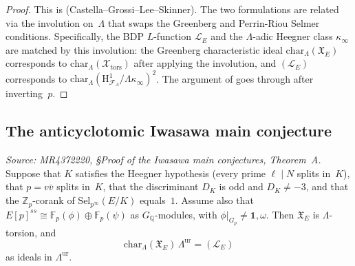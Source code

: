 \begin{proof}
  This is \cite[Thm.~5.2]{BCK} (Castella--Grossi--Lee--Skinner). The two formulations
  are related via the involution on~$\Lambda$ that swaps the Greenberg and
  Perrin-Riou Selmer conditions. Specifically, the BDP $L$-function $\mathcal{L}_E$
  and the $\Lambda$-adic Heegner class $\kappa_\infty$ are matched by this
  involution: the Greenberg characteristic ideal $\mathrm{char}_\Lambda(\mathfrak{X}_E)$
  corresponds to $\mathrm{char}_\Lambda(\mathcal{X}_{\mathrm{tors}})$ after applying
  the involution, and $(\mathcal{L}_E)$ corresponds to
  $\mathrm{char}_\Lambda(\mathrm{H}^1_{\mathcal{F}_\Lambda}/\Lambda\kappa_\infty)^2$.
  The argument of \cite{BCK} goes through after inverting~$p$.
\end{proof}

\subsection{The anticyclotomic Iwasawa main conjecture}

\begin{theorem}
  \label{thm:thmA}
  \textit{Source: MR4372220, \S{}Proof of the Iwasawa main conjectures, Theorem~A.}
  Suppose that $K$ satisfies the Heegner hypothesis (every prime $\ell \mid N$ splits
  in~$K$), that $p = v\bar{v}$ splits in~$K$, that the discriminant $D_K$ is odd and
  $D_K \neq -3$, and that the $\mathbb{Z}_p$-corank of $\mathrm{Sel}_{p^\infty}(E/K)$
  equals~$1$. Assume also that $E[p]^{ss} \cong \mathbb{F}_p(\phi) \oplus \mathbb{F}_p(\psi)$
  as $G_{\mathbb{Q}}$-modules, with $\phi|_{G_p} \neq \mathbf{1}, \omega$.
  Then $\mathfrak{X}_E$ is $\Lambda$-torsion, and
  \[
    \mathrm{char}_\Lambda(\mathfrak{X}_E)\,\Lambda^{\mathrm{ur}} = (\mathcal{L}_E)
  \]
  as ideals in $\Lambda^{\mathrm{ur}}$.
\end{theorem}

